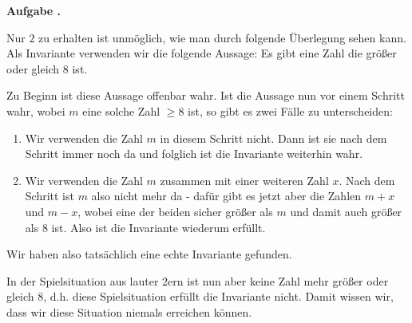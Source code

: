 \documentclass[a4paper,ngerman,12pt]{scrartcl}
\theoremstyle{definition}
\theoremstyle{plain}
\theoremstyle{remark}
\newlength{\aufgabenskip}
\newcounter{aufgabennummer}
\newenvironment{aufgabe}[1]{
	\addtocounter{aufgabennummer}{1}
	\textbf{Aufgabe \theaufgabennummer.} \emph{#1} \par
}{\vspace{\aufgabenskip}}
\begin{document}
\begin{aufgabe}{}
Nur $2$ zu erhalten ist unmöglich, wie man durch folgende Überlegung sehen kann. Als Invariante verwenden wir die folgende Aussage: \glqq Es gibt eine Zahl die größer oder gleich $8$ ist.\grqq

Zu Beginn ist diese Aussage offenbar wahr. Ist die Aussage nun vor einem Schritt wahr, wobei $m$ eine solche Zahl $\geq 8$ ist, so gibt es zwei Fälle zu unterscheiden:
\begin{enumerate}
	\item Wir verwenden die Zahl $m$ in diesem Schritt nicht. Dann ist sie nach dem Schritt immer noch da und folglich ist die Invariante weiterhin wahr. 
	\item Wir verwenden die Zahl $m$ zusammen mit einer weiteren Zahl $x$. Nach dem Schritt ist $m$ also nicht mehr da - dafür gibt es jetzt aber die Zahlen $m+x$ und $m-x$, wobei eine der beiden sicher größer als $m$ und damit auch größer als $8$ ist. Also ist die Invariante wiederum erfüllt.
\end{enumerate}
Wir haben also tatsächlich eine echte Invariante gefunden. 

In der Spielsituation aus lauter $2$ern ist nun aber keine Zahl mehr größer oder gleich $8$, d.h. diese Spielsituation erfüllt die Invariante nicht. Damit wissen wir, dass wir diese Situation niemals erreichen können.


\end{aufgabe}
\end{document}
